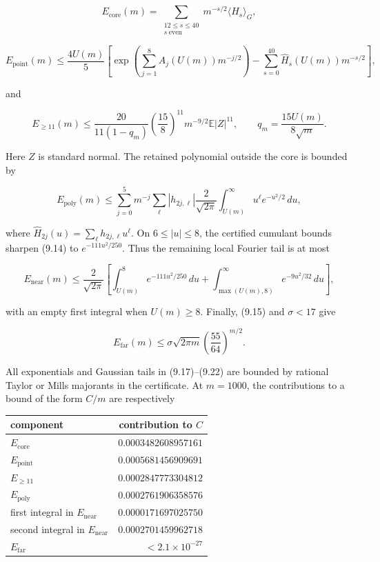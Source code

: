 \documentclass[11pt]{article}
\numberwithin{equation}{section}
\begin{document}
\[
E_{\mathrm{core}}(m)=
\sum_{\substack{12\le s\le40\\s\ \mathrm{even}}}
m^{-s/2}\langle \widehat H_s\rangle_G,
\tag{9.17}
\]

\[
E_{\mathrm{point}}(m)\le
\frac{4U(m)}5
\left[
\exp\left(\sum_{j=1}^{8}A_j(U(m))m^{-j/2}\right)
-\sum_{s=0}^{40}\widehat H_s(U(m))m^{-s/2}
\right],
\tag{9.18}
\]

and

\[
E_{\ge11}(m)\le
\frac{20}{11(1-q_m)}
\left(\frac{15}{8}\right)^{11}
m^{-9/2}\mathbb E|Z|^{11},
\qquad
q_m=\frac{15U(m)}{8\sqrt m}.
\tag{9.19}
\]

Here $Z$ is standard normal. The retained polynomial outside the core is bounded by

\[
E_{\mathrm{poly}}(m)\le
\sum_{j=0}^{5}m^{-j}
\sum_{\ell}|h_{2j,\ell}|
\frac{2}{\sqrt{2\pi}}\int_{U(m)}^\infty
u^\ell e^{-u^2/2}\,du,
\tag{9.20}
\]

where $\widehat H_{2j}(u)=\sum_\ell h_{2j,\ell}u^\ell$. On $6\le|u|\le8$, the certified
cumulant bounds sharpen (9.14) to $e^{-111u^2/250}$. Thus the remaining local Fourier
tail is at most

\[
E_{\mathrm{near}}(m)\le
\frac{2}{\sqrt{2\pi}}
\left[
\int_{U(m)}^{8}e^{-111u^2/250}\,du
+\int_{\max(U(m),8)}^\infty e^{-9u^2/32}\,du
\right],
\tag{9.21}
\]

with an empty first integral when $U(m)\ge8$. Finally, (9.15) and $\sigma<17$ give

\[
E_{\mathrm{far}}(m)\le
\sigma\sqrt{2\pi m}\left(\frac{55}{64}\right)^{m/2}.
\tag{9.22}
\]

All exponentials and Gaussian tails in (9.17)--(9.22) are bounded by rational Taylor or
Mills majorants in the certificate. At $m=1000$, the contributions to a bound of the
form $C/m$ are respectively

\begin{center}
\renewcommand{\arraystretch}{1.08}
\begin{tabular}{@{}l r@{}}
\toprule
component & contribution to $C$ \\
\midrule
$E_{\mathrm{core}}$ & $0.0003482608957161$ \\
$E_{\mathrm{point}}$ & $0.0005681456909691$ \\
$E_{\ge11}$ & $0.0002847773304812$ \\
$E_{\mathrm{poly}}$ & $0.0002761906358576$ \\
first integral in $E_{\mathrm{near}}$ & $0.0000171697025750$ \\
second integral in $E_{\mathrm{near}}$ & $0.0002701459962718$ \\
$E_{\mathrm{far}}$ & $<2.1\times10^{-27}$ \\
\bottomrule
\end{tabular}
\end{center}
\end{document}
